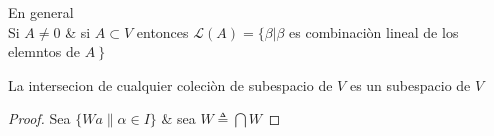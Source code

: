 En general \\ Si $A \neq 0$	\& si $ A \subset V $ entonces $\mathcal{L} (A)= \{ \beta | \beta $ es combinaci\`on lineal de los elemntos de $A \ \}$
\begin{proposicion}
			La intersecion de cualquier coleci\`on de subespacio de $V$ es un subespacio de $V$	 	 										
	 	 									\end{proposicion}	 	 									
\begin{proof}
Sea $ \{ Wa \| \alpha \in I \} $ \& sea $ W \triangleq \bigcap W $
\end{proof}